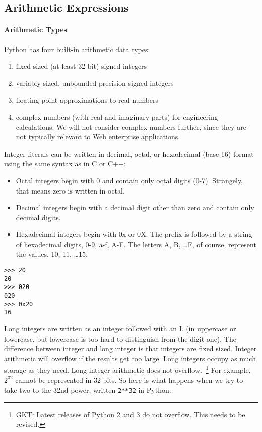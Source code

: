 \subsection{Arithmetic Expressions}
\paragraph{Arithmetic Types}

Python has four built-in arithmetic data types:

\begin{enumerate}
\item fixed sized (at least 32-bit) signed integers
\item variably sized, unbounded precision signed integers
\item floating point approximations to real numbers
\item complex numbers (with real and imaginary parts) for engineering calculations. We will not consider complex numbers further, since they are not typically relevant to Web enterprise applications.
\end{enumerate}

Integer literals can be written in
decimal, octal, or hexadecimal (base 16) format using the same syntax as
in C or C++:

\begin{itemize}
\item
  Octal integers begin with 0 and
  contain only octal digits (0-7). Strangely, that means zero is written
  in octal.
\item
  Decimal integers begin with a
  decimal digit other than zero and contain only decimal digits.
\item
  Hexadecimal integers begin with
  0x or 0X. The prefix is followed by a string of hexadecimal digits,
  0-9, a-f, A-F. The letters A, B, \ldots F, of course, represent the
  values, 10, 11, \ldots 15.
\end{itemize}


\begin{verbatim}
>>> 20
20
>>> 020
020
>>> 0x20
16
\end{verbatim}

Long integers are written as an
integer followed with an L (in uppercase or lowercase, but lowercase is too
hard to distinguish from the digit one). The difference between integer
and long integer is that integers are fixed sized. Integer arithmetic
will overflow if the results get too large. Long integers occupy as much
storage as they need. Long integer arithmetic does not overflow.~\footnote{GKT: Latest releases of Python 2 and 3 do not overflow. This needs to be revised.} For
example, $2^{32}$ cannot be represented in 32 bits. So here is what
happens when we try to take two to the 32nd power, written \texttt{2**32}
in Python:


